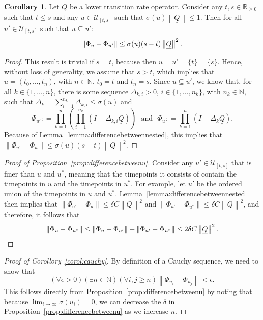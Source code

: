 \documentclass[10pt,a4paper]{paper}
\theoremstyle{definition}
\newtheorem{corollary}[theorem]{Corollary}
\newcommand{\nats}{\mathbb{N}}
\newcommand{\reals}{\mathbb{R}}
\newcommand{\realsnonneg}{\reals_{\geq 0}}
\newcommand{\lrate}{\underline{Q}}
\newcommand{\norm}[1]{\left\lVert #1 \right\rVert}
\newcommand{\coloneqq}{:\!=}
\begin{document}
\begin{corollary}\label{corol:differencebetweennestedintermsofu}
Let $\lrate$ be a lower transition rate operator. Consider any $t,s\in\realsnonneg$ such that $t\leq s$ and any $u\in\mathcal{U}_{[t,s]}$ such that $\sigma(u)\norm{\lrate}\leq 1$. Then for all $u'\in\mathcal{U}_{[t,s]}$ such that $u\subseteq u'$:
\begin{equation*}
\norm{\Phi_u-\Phi_{u'}}\leq\sigma(u)(s-t)\norm{\lrate}^2.\vspace{5pt}
\end{equation*}
\end{corollary}
\begin{proof}
This result is trivial if $s=t$, because then $u=u'=\{t\}=\{s\}$. Hence, without loss of generality, we assume that $s>t$, which implies that $u=(t_0,\dots,t_n)$, with $n\in\nats$, $t_0=t$ and $t_n=s$.
Since $u\subseteq u'$, we know that, for all $k\in\{1,\dots,n\}$, there is some sequence $\Delta_{k,i}> 0$, $i\in\{1,\dots,n_k\}$, with $n_k\in\nats$, such that $\Delta_k=\sum_{i=1}^{n_k}\Delta_{k,i}\leq\sigma(u)$ and
\begin{equation*}
\Phi_{u'}\coloneqq\prod_{k=1}^n\left(\prod_{i=1}^{n_k}(I+\Delta_{k,i}\lrate)\right)
\text{~~and~~}
\Phi_{u}\coloneqq\prod_{k=1}^n(I+\Delta_{k}\lrate).
\end{equation*}
Because of Lemma~\ref{lemma:differencebetweennested}, this implies that $\norm{\Phi_{u'}-\Phi_u}\leq\sigma(u)(s-t)\norm{\lrate}^2$. 
\end{proof}


\begin{proof}[Proof of Proposition~\ref{prop:differencebetweenu}]
Consider any $u'\in\mathcal{U}_{[t,s]}$ that is finer than $u$ and $u^*$, meaning that the timepoints it consists of contain the timepoints in $u$ and the timepoints in $u^*$. For example, let $u'$ be the ordered union of the timepoints in $u$ and $u^*$. Lemma~\ref{lemma:differencebetweennested} then implies that $\norm{\Phi_{u'}-\Phi_u}\leq\delta C\norm{\lrate}^2$ and $\norm{\Phi_{u'}-\Phi_{u^*}}\leq\delta C\norm{\lrate}^2$, and therefore, it follows that
\begin{equation*}
\norm{\Phi_{u}-\Phi_{u^*}}
\leq
\norm{\Phi_{u}-\Phi_{u'}}
+
\norm{\Phi_{u'}-\Phi_{u^*}}
\leq2\delta C\norm{\lrate}^2.\vspace{-10pt}
\end{equation*}
\end{proof}


\begin{proof}[Proof of Corollory~\ref{corol:cauchy}]
By definition of a Cauchy sequence, we need to show that
\begin{equation*}
(\forall \epsilon>0)(\exists n\in\nats)(\forall i,j\geq n)
\norm{\Phi_{u_i}-\Phi_{u_j}}<\epsilon.
\end{equation*}
This follows directly from Proposition~\ref{prop:differencebetweenu} by noting that because $\lim_{i\to\infty}\sigma(u_i)=0$, we can decrease the $\delta$ in Proposition~\ref{prop:differencebetweenu} as we increase $n$.
\end{proof}
\end{document}
